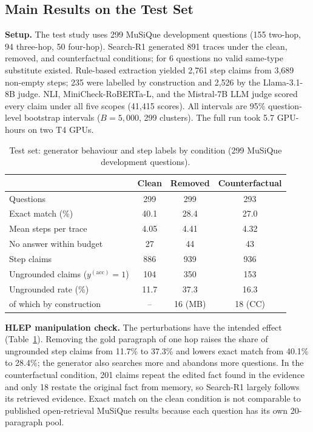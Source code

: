 \documentclass[conference]{IEEEtran}
\begin{document}
\subsection{Main Results on the Test Set}
\textbf{Setup.} The test study uses 299 MuSiQue development questions (155 two-hop, 94 three-hop, 50 four-hop). Search-R1 generated 891 traces under the clean, removed, and counterfactual conditions; for 6 questions no valid same-type substitute existed. Rule-based extraction yielded 2,761 step claims from 3,689 non-empty steps; 235 were labelled by construction and 2,526 by the Llama-3.1-8B judge. NLI, MiniCheck-RoBERTa-L, and the Mistral-7B LLM judge scored every claim under all five scopes (41,415 scores). All intervals are 95\% question-level bootstrap intervals ($B=5{,}000$, 299 clusters). The full run took 5.7 GPU-hours on two T4 GPUs.

\begin{table}[t]
\caption{Test set: generator behaviour and step labels by condition (299 MuSiQue development questions).}\label{tab:gen}
\centering\footnotesize
\begin{tabular}{@{}lccc@{}}
\toprule
 & Clean & Removed & Counterfactual \\
\midrule
Questions & 299 & 299 & 293 \\
Exact match (\%) & 40.1 & 28.4 & 27.0 \\
Mean steps per trace & 4.05 & 4.41 & 4.32 \\
No answer within budget & 27 & 44 & 43 \\
Step claims & 886 & 939 & 936 \\
Ungrounded claims ($y^{(\mathrm{acc})}=1$) & 104 & 350 & 153 \\
Ungrounded rate (\%) & 11.7 & 37.3 & 16.3 \\
\quad of which by construction & -- & 16 (MB) & 18 (CC) \\
\bottomrule
\end{tabular}
\end{table}

\textbf{HLEP manipulation check.} The perturbations have the intended effect (Table~\ref{tab:gen}). Removing the gold paragraph of one hop raises the share of ungrounded step claims from 11.7\% to 37.3\% and lowers exact match from 40.1\% to 28.4\%; the generator also searches more and abandons more questions. In the counterfactual condition, 201 claims repeat the edited fact found in the evidence and only 18 restate the original fact from memory, so Search-R1 largely follows its retrieved evidence. Exact match on the clean condition is not comparable to published open-retrieval MuSiQue results because each question has its own 20-paragraph pool.
\end{document}
